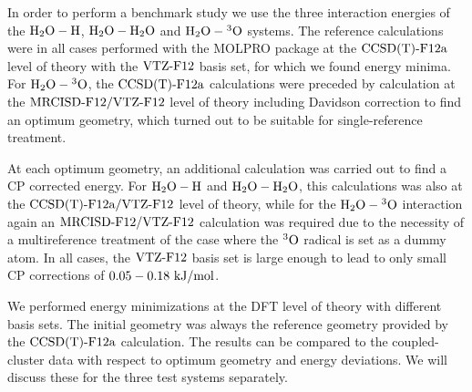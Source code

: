 In order to perform a benchmark study we use the three interaction energies of
the $\mbox{\ensuremath{\text H _2 \text O-\text H}}$, $\mbox{\ensuremath{\text H _2 \text O-\text H _2 \text O}}$ and $\mbox{\ensuremath{\text H _2 \text O-\hspace{.2pt} ^3\text{O}}}$ systems.
The reference calculations were in all cases performed with the MOLPRO \cite{MOLPRO_brief} package
at the $\text{CCSD(T)-F12a}$ \cite{KniziaAdlerWerner2009} level of theory with the
$\text{VTZ-F}12$\cite{YousafPeterson2008} basis set, for which we found energy minima.
For $\mbox{\ensuremath{\text H _2 \text O-\hspace{.2pt} ^3\text{O}}}$, the $\text{CCSD(T)-F12a}$ calculations were preceded by  
calculation at the $\text{MRCISD-F12}/\text{VTZ-F}12$\cite{ShiozakiKniziaWerner2011} level of theory
including Davidson correction\cite{LanghoffDavidson1974} to find an optimum
geometry, which turned out to be suitable for single-reference treatment.

At each optimum geometry, an additional calculation was carried out to find a CP
corrected energy. For $\mbox{\ensuremath{\text H _2 \text O-\text H}}$ and $\mbox{\ensuremath{\text H _2 \text O-\text H _2 \text O}}$, this calculations was also at the $\text{CCSD(T)-F12a}/\text{VTZ-F}12$ level
of theory, while for the $\mbox{\ensuremath{\text H _2 \text O-\hspace{.2pt} ^3\text{O}}}$ interaction again an $\text{MRCISD-F12}/\text{VTZ-F}12$ calculation was
required due to the necessity of a multireference treatment of the case where the
$^3\text O$ radical is set as a dummy atom. In all cases, the $\text{VTZ-F}12$ basis set is 
large enough to lead to only small CP corrections of $0.05 - 0.18 \ \text {kJ/mol}$. 

We performed energy minimizations at the DFT level of theory with different basis sets. The initial
geometry was always the reference geometry provided by the $\text{CCSD(T)-F12a}$ calculation. The results can be compared
to the coupled-cluster data with respect to optimum geometry and energy deviations. We will discuss
these for the three test systems separately.

